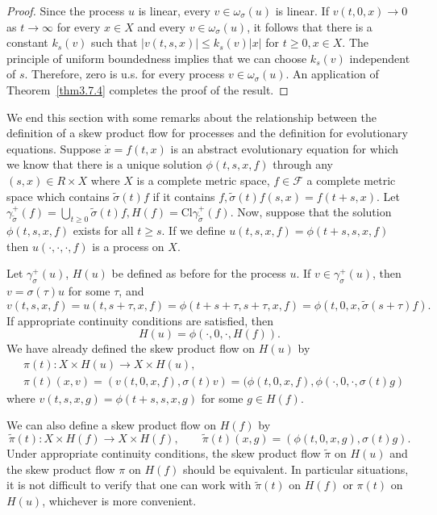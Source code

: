 \documentclass{surv-l}
\theoremstyle{plain}
\theoremstyle{definition}
\numberwithin{equation}{section}
\numberwithin{figure}{chapter}
\begin{document}
\begin{proof} Since the process $u$ is linear, every $v\in\omega_{\sigma}(u)$ is linear. If $ v(t, 0, x)\rightarrow 0$ as $ t\rightarrow\infty$ for every $x\in X$ and every $v\in\omega_{\sigma}(u)$, it follows that there is a constant $k_{s}(v)$ such that $|v(t,s,x)|\leq k_{s}(v)|x|$ for $t\geq 0, x\in X$. The principle of uniform boundedness implies that we can choose $k_{s}(v)$ independent of $s$. Therefore, zero is u.s. for every process $v\in\omega_{\sigma}(u)$. An application of Theorem~\ref{thm3.7.4} completes the proof of the result.
\end{proof}

We end this section with some remarks about the relationship between the definition of a skew product flow for processes and the definition for evolutionary equations. Suppose $\dot{x}=f(t,x)$ is an abstract evolutionary equation for which we know that there is a unique solution $\phi(t,s,x,f)$ through any $(s,x)\in R\times X$ where $X$ is a complete metric space, $f\in \mathcal{F}$ a complete metric space which contains $\tilde{\sigma}(t)f$ if it contains $f,\tilde{\sigma}(t)f(s,x)=f(t+s, x)$. Let $\gamma_{\tilde{\sigma}}^{+}(f)=\bigcup_{t\geq 0}\tilde{\sigma}(t)f,H(f)= \mathrm{Cl}\gamma_{\tilde{\sigma}}^{+}(f)$. Now, suppose that the solution $\phi(t,s,x,f)$ exists for all $t\geq s$. If we define $u(t,s,x,f)=\phi(t+s,s,x,f)$ then $u(\cdot,\cdot,\cdot,f)$ is a process on $X$.

Let $\gamma_{\sigma}^{+}(u)$, $H(u)$ be defined as before for the process $u$. If $v\in\gamma_{\sigma}^{+}(u)$, then $v=\sigma(\tau)u$ for some $\tau$, and
\begin{equation*}
v(t,s,x,f)=u(t,s+\tau,x,f)=\phi(t+s+\tau,s+\tau,x,f)=\phi(t,0,x,\tilde{\sigma}(s+\tau)f).
\end{equation*}
If appropriate continuity conditions are satisfied, then
\begin{equation*}
H(u)=\phi(\cdot,0,\cdot,H(f)).
\end{equation*}
We have already defined the skew product flow on $H(u)$ by
\begin{align*}
&\pi(t)\!:X\times H(u)\rightarrow X\times H(u),\\
&\pi(t)(x,v)=(v(t,0,x,f), \sigma(t)v)=(\phi(t,0,x,f),\phi(\cdot,0,\cdot,\sigma(t)g)
\end{align*}
where $v(t,s,x,g)=\phi(t+s,s,x,g)$ for some $g\in H(f)$.

We can also define a skew product flow on $H(f)$ by
\begin{equation*}
\tilde{\pi}(t)\!:X\times H(f)\rightarrow X\times H(f),\qquad \tilde{\pi}(t)(x, g)=(\phi(t, 0, x, g),\sigma(t)g).
\end{equation*}
Under appropriate continuity conditions, the skew product flow $\tilde{\pi}$ on $H(u)$ and the skew product flow $\pi$ on $H(f)$ should be equivalent. In particular situations, it is not difficult to verify that one can work with $\tilde{\pi}(t)$ on $H(f)$ or $\pi(t)$ on $H(u)$, whichever is more convenient.
\end{document}
